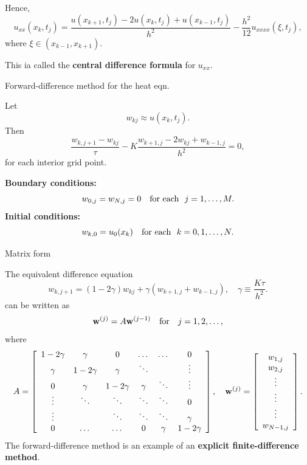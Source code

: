 \documentclass{beamer}
\begin{document}


\begin{frame}{}
Hence,
\[
u_{xx}(x_k,t_j)=\frac{u(x_{k+1},t_j)-2u(x_k,t_j)+u(x_{k-1},t_j)}{h^2}
-\frac{h^2}{12}u_{xxxx}(\xi,t_{j}),
\]
where $\xi\in(x_{k-1},x_{k+1})$.

This ia called the {\bf central difference formula} for $u_{xx}$.


\end{frame}



\begin{frame}{Forward-difference method for the heat eqn.}

Let
\[
w_{kj}\approx u(x_{k},t_{j}).
\]
Then
\[
\frac{w_{k,j+1}-w_{kj}}{\tau}-K
\frac{w_{k+1, j}-2w_{kj}+w_{k-1,j}}{h^{2}}=0,
\]
for each interior grid point.

{\bf Boundary conditions:}
\[
w_{0,j}=w_{N,j}=0  \quad
{\rm for \ each} \ \ j=1, \dots, M.
\]
{\bf Initial conditions:}
\[
w_{k,0}=u_{0}(x_{k})  \quad
{\rm for \ each} \ \ k=0, 1, \dots, N.
\]


\end{frame}



\begin{frame}{\small Matrix form}

{\small
The equivalent difference equation
\[
w_{k,j+1}=\left(1-2\gamma\right)w_{kj}+
\gamma\left(
w_{k+1, j}+w_{k-1,j}\right), \quad \gamma\equiv \frac{K\tau}{h^{2}}.
\]
can be written as
\[
{\bf w}^{(j)}=A{\bf w}^{(j-1)} \quad \hbox{for} \quad j=1,2,\dots,
\]
where
\[
A=\left[
\begin{array}{cccccc}
1-2\gamma &\gamma &0      &\dots  &\dots &0 \\
\gamma &1-2\gamma &\gamma &\ddots  &     &\vdots \\
0      &\gamma &1-2\gamma &\gamma &\ddots &\vdots \\
\vdots &\ddots &\ddots &\ddots &\ddots &0 \\
\vdots &       &\ddots &\ddots &\ddots &\gamma \\
0      &\dots  &\dots  &0      &\gamma &1-2\gamma
\end{array}\right], \quad
{\bf w}^{(j)}=\left[
\begin{array}{c}
w_{1,j} \\
w_{2,j} \\
\vdots \\
\vdots \\
\vdots \\
w_{N-1,j}
\end{array}\right].
\label{b7}
\]
The forward-difference method is an example of an {\bf explicit finite-difference method}.
}





\end{frame}
\end{document}

